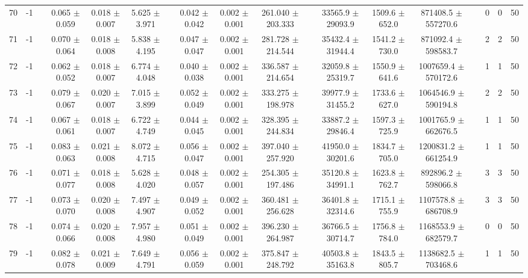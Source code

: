 \documentclass[11pt]{article}
\begin{document}
\begin{landscape}
\begin{table}
\begin{tabular}{cccccccccccccccccc}
70 &      -1 &&  0.065 $\pm$ 0.059 & 0.018 $\pm$ 0.007 & 5.625 $\pm$ 3.971 &&  0.042 $\pm$ 0.042 & 0.002 $\pm$ 0.001 & 261.040 $\pm$ 203.333 &&  33565.9 $\pm$ 29093.9 & 1509.6 $\pm$ 652.0 & 871408.5 $\pm$ 557270.6 && 0& 0& 50\\
71 &      -1 &&  0.070 $\pm$ 0.064 & 0.018 $\pm$ 0.008 & 5.838 $\pm$ 4.195 &&  0.047 $\pm$ 0.047 & 0.002 $\pm$ 0.001 & 281.728 $\pm$ 214.544 &&  35432.4 $\pm$ 31944.4 & 1541.2 $\pm$ 730.0 & 871092.4 $\pm$ 598583.7 && 2& 2& 50\\
72 &      -1 &&  0.062 $\pm$ 0.052 & 0.018 $\pm$ 0.007 & 6.774 $\pm$ 4.048 &&  0.040 $\pm$ 0.038 & 0.002 $\pm$ 0.001 & 336.587 $\pm$ 214.654 &&  32059.8 $\pm$ 25319.7 & 1550.9 $\pm$ 641.6 & 1007659.4 $\pm$ 570172.6 && 1& 1& 50\\
73 &      -1 &&  0.079 $\pm$ 0.067 & 0.020 $\pm$ 0.007 & 7.015 $\pm$ 3.899 &&  0.052 $\pm$ 0.049 & 0.002 $\pm$ 0.001 & 333.275 $\pm$ 198.978 &&  39977.9 $\pm$ 31455.2 & 1733.6 $\pm$ 627.0 & 1064546.9 $\pm$ 590194.8 && 2& 2& 50\\
74 &      -1 &&  0.067 $\pm$ 0.061 & 0.018 $\pm$ 0.007 & 6.722 $\pm$ 4.749 &&  0.044 $\pm$ 0.045 & 0.002 $\pm$ 0.001 & 328.395 $\pm$ 244.834 &&  33887.2 $\pm$ 29846.4 & 1597.3 $\pm$ 725.9 & 1001765.9 $\pm$ 662676.5 && 1& 1& 50\\
75 &      -1 &&  0.083 $\pm$ 0.063 & 0.021 $\pm$ 0.008 & 8.072 $\pm$ 4.715 &&  0.056 $\pm$ 0.047 & 0.002 $\pm$ 0.001 & 397.040 $\pm$ 257.920 &&  41950.0 $\pm$ 30201.6 & 1834.7 $\pm$ 705.0 & 1200831.2 $\pm$ 661254.9 && 1& 1& 50\\
76 &      -1 &&  0.071 $\pm$ 0.077 & 0.018 $\pm$ 0.008 & 5.628 $\pm$ 4.020 &&  0.048 $\pm$ 0.057 & 0.002 $\pm$ 0.001 & 254.305 $\pm$ 197.486 &&  35120.8 $\pm$ 34991.1 & 1623.8 $\pm$ 762.7 & 892896.2 $\pm$ 598066.8 && 3& 3& 50\\
77 &      -1 &&  0.073 $\pm$ 0.070 & 0.020 $\pm$ 0.008 & 7.497 $\pm$ 4.907 &&  0.049 $\pm$ 0.052 & 0.002 $\pm$ 0.001 & 360.481 $\pm$ 256.628 &&  36401.8 $\pm$ 32314.6 & 1715.1 $\pm$ 755.9 & 1107578.8 $\pm$ 686708.9 && 3& 3& 50\\
78 &      -1 &&  0.074 $\pm$ 0.066 & 0.020 $\pm$ 0.008 & 7.957 $\pm$ 4.980 &&  0.051 $\pm$ 0.049 & 0.002 $\pm$ 0.001 & 396.230 $\pm$ 264.987 &&  36766.5 $\pm$ 30714.7 & 1756.8 $\pm$ 784.0 & 1168553.9 $\pm$ 682579.7 && 0& 0& 50\\
79 &      -1 &&  0.082 $\pm$ 0.078 & 0.021 $\pm$ 0.009 & 7.649 $\pm$ 4.791 &&  0.056 $\pm$ 0.059 & 0.002 $\pm$ 0.001 & 375.847 $\pm$ 248.792 &&  40503.8 $\pm$ 35163.8 & 1843.5 $\pm$ 805.7 & 1138682.5 $\pm$ 703468.6 && 1& 1& 50\\

\end{tabular}
\end{table}
\end{landscape}
\end{document}

